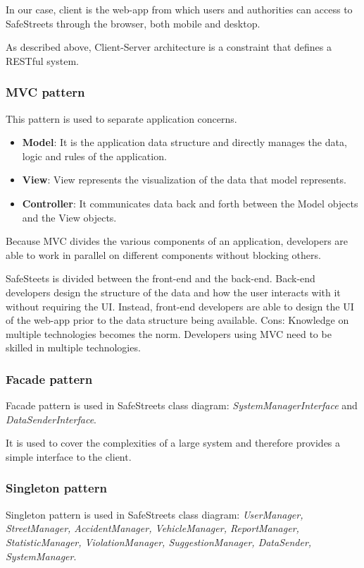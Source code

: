 In our case, client is the web-app from which users and authorities can access to SafeStreets through the browser, both mobile and desktop.

As described above, Client-Server architecture is a constraint that defines a RESTful system.

\subsubsection{MVC pattern}
This pattern is used to separate application concerns.
\begin{itemize}
	\item \textbf{Model}: It is the application data structure and directly manages the data, logic and rules of the application.
	\item \textbf{View}: View represents the visualization of the data that model represents.
	\item \textbf{Controller}: It communicates data back and forth between the Model objects and the View objects.
\end{itemize}

Because MVC divides the various components of an application, developers are able to work in parallel on different components without blocking others. 

SafeSteets is divided between the front-end and the back-end. Back-end developers design the structure of the data and how the user interacts with it without requiring the UI. Instead, front-end developers are able to design the UI of the web-app prior to the data structure being available.
Cons: Knowledge on multiple technologies becomes the norm. Developers using MVC need to be skilled in multiple technologies.


\subsubsection{Facade pattern}
Facade pattern is used in SafeStreets class diagram: \textit{SystemManagerInterface} and \textit{DataSenderInterface}.

It is used to cover the complexities of a large system and therefore provides a simple interface to the client. 


\subsubsection{Singleton pattern}
Singleton pattern is used in SafeStreets class diagram: \textit{UserManager, StreetManager, AccidentManager, VehicleManager, ReportManager, StatisticManager, ViolationManager, SuggestionManager, DataSender, SystemManager}.

